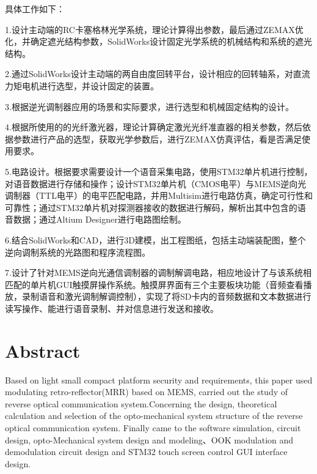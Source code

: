 具体工作如下：

1.设计主动端的RC卡塞格林光学系统，理论计算得出参数，最后通过ZEMAX优化，并确定遮光结构参数，SolidWorks设计固定光学系统的机械结构和系统的遮光结构。

2.通过SolidWorks设计主动端的两自由度回转平台，设计相应的回转轴系，对直流力矩电机进行选型，并设计固定的装置。

3.根据逆光调制器应用的场景和实际要求，进行选型和机械固定结构的设计。

4.根据所使用的的光纤激光器，理论计算确定激光光纤准直器的相关参数，然后依据参数进行产品的选型，获取光学参数后，进行ZEMAX仿真评估，看是否满足使用要求。

5.电路设计。根据要求需要设计一个语音采集电路，使用STM32单片机进行控制，对语音数据进行存储和操作；设计STM32单片机（CMOS电平）与MEMS逆向光调制器（TTL电平）的电平匹配电路，并用Multisim进行电路仿真，确定可行性和可靠性；通过STM32单片机对探测器接收的数据进行解码，解析出其中包含的语音数据；通过Altium Designer进行电路图绘制。

6.结合SolidWorks和CAD，进行3D建模，出工程图纸，包括主动端装配图，整个逆向调制系统的光路图和程序流程图。

7.设计了针对MEMS逆向光通信调制器的调制解调电路，相应地设计了与该系统相匹配的单片机GUI触摸屏操作系统。触摸屏界面有三个主要板块功能（音频查看播放，录制语音和激光调制解调控制），实现了将SD卡内的音频数据和文本数据进行读写操作、能进行语音录制、并对信息进行发送和接收。


\chapter[Abstract]{Abstract}%

Based on light small compact platform security and requirements, this paper used modulating retro-reflector(MRR) based on MEMS, carried out the study of reverse optical communication system.Concerning the design, theoretical calculation and selection of the  opto-mechanical system structure of the reverse optical communication system. Finally came to the software simulation, circuit design,  opto-Mechanical system design and modeling、OOK modulation and demodulation circuit design and STM32 touch screen control GUI interface design.


